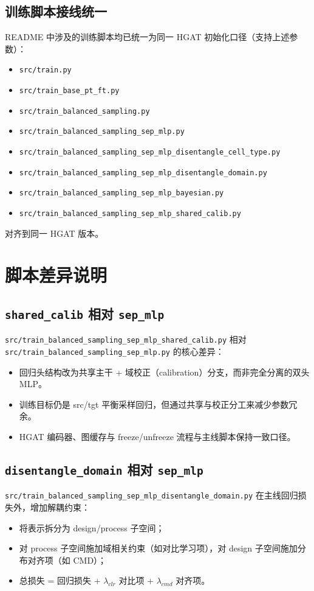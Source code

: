 \documentclass[12pt,a4paper]{ctexart}
\begin{document}
\subsection{训练脚本接线统一}
README 中涉及的训练脚本均已统一为同一 HGAT 初始化口径（支持上述参数）：
\begin{itemize}
  \item \texttt{src/train.py}
  \item \texttt{src/train\_base\_pt\_ft.py}
  \item \texttt{src/train\_balanced\_sampling.py}
  \item \texttt{src/train\_balanced\_sampling\_sep\_mlp.py}
  \item \texttt{src/train\_balanced\_sampling\_sep\_mlp\_disentangle\_cell\_type.py}
  \item \texttt{src/train\_balanced\_sampling\_sep\_mlp\_disentangle\_domain.py}
  \item \texttt{src/train\_balanced\_sampling\_sep\_mlp\_bayesian.py}
\end{itemize}

\begin{itemize}
  \item \texttt{src/train\_balanced\_sampling\_sep\_mlp\_shared\_calib.py}
\end{itemize}
对齐到同一 HGAT 版本。

\section{脚本差异说明}
\subsection{\texttt{shared\_calib} 相对 \texttt{sep\_mlp}}
\texttt{src/train\_balanced\_sampling\_sep\_mlp\_shared\_calib.py} 相对
\texttt{src/train\_balanced\_sampling\_sep\_mlp.py} 的核心差异：
\begin{itemize}
  \item 回归头结构改为共享主干 + 域校正（calibration）分支，而非完全分离的双头 MLP。
  \item 训练目标仍是 src/tgt 平衡采样回归，但通过共享与校正分工来减少参数冗余。
  \item HGAT 编码器、图缓存与 freeze/unfreeze 流程与主线脚本保持一致口径。
\end{itemize}

\subsection{\texttt{disentangle\_domain} 相对 \texttt{sep\_mlp}}
\texttt{src/train\_balanced\_sampling\_sep\_mlp\_disentangle\_domain.py} 在主线回归损失外，增加解耦约束：
\begin{itemize}
  \item 将表示拆分为 design/process 子空间；
  \item 对 process 子空间施加域相关约束（如对比学习项），对 design 子空间施加分布对齐项（如 CMD）；
  \item 总损失 = 回归损失 + \(\lambda_{clr}\) 对比项 + \(\lambda_{cmd}\) 对齐项。
\end{itemize}
\end{document}
